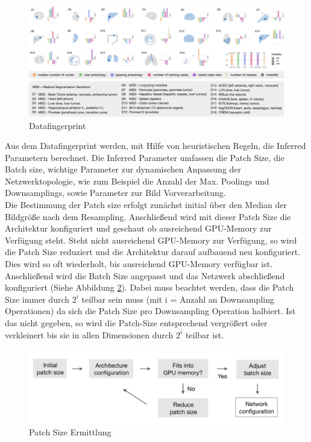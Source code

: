 \begin{figure}[H]
	
	\centering
	\includegraphics[scale=0.45]{Pictures/nnUnet/Bild03.png}
	\caption{Datafingerprint \cite{nnunetPaperB}}
	\label{pic:nnUnet_Datafingerprint}
\end{figure}


Aus dem Datafingerprint werden, mit Hilfe von heuristischen Regeln, die Inferred Parametern berechnet. Die Inferred Parameter umfassen die Patch Size, die Batch size, wichtige Parameter zur dynamischen Anpassung der Netzwerktopologie, wie zum Beispiel die Anzahl der Max. Poolings und Downsamplings, sowie Parameter zur Bild Vorverarbeitung. \\
Die Bestimmung der Patch size erfolgt zunächst initial über den Median der Bildgröße nach dem Resampling. Anschließend wird mit dieser Patch Size die Architektur konfiguriert und geschaut ob ausreichend GPU-Memory zur Verfügung steht. Steht nicht ausreichend GPU-Memory zur Verfügung, so wird die Patch Size reduziert und die Architektur darauf aufbauend neu konfiguriert. Dies wird so oft wiederholt, bis ausreichend GPU-Memory verfügbar ist. Anschließend wird die Batch Size angepasst und das Netzwerk abschließend konfiguriert (Siehe Abbildung \ref{pic:nnUnet_PatchSize}). Dabei muss beachtet werden, dass die Patch Size immer durch $2^i$ teilbar sein muss (mit i = Anzahl an Downsampling Operationen) da sich die Patch Size pro Downsampling Operation halbiert. Ist das nicht gegeben, so wird die Patch-Size entsprechend vergrößert oder verkleinert bis sie in allen Dimensionen durch $2^i$ teilbar ist.
 
 \begin{figure}[H]
 	
 	\centering
 	\includegraphics[scale=0.6]{Pictures/nnUnet/Bild04.png}
 	\caption{Patch Size Ermittlung \cite{nnunetPaperB} }
 	\label{pic:nnUnet_PatchSize}
 \end{figure}
 

